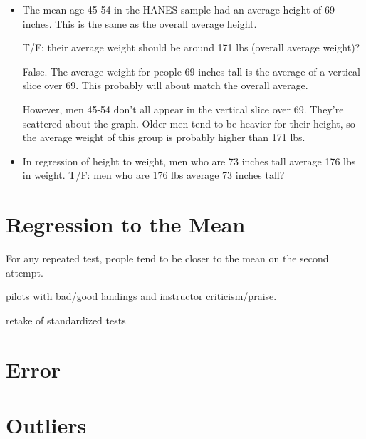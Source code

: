 \documentclass[landscape]{exam}
\begin{document}
\begin{itemize}
    \item The mean age 45-54 in the HANES sample had an average height of 69
      inches.  This is the same as the overall average height.

      T/F: their average weight should be around 171 lbs (overall average weight)?

      \begin{solution}
        False.  The average weight for people 69 inches tall is the average of a
        vertical slice over 69.  This probably will about match the overall average.

        However, men 45-54 don't all appear in the vertical slice over 69.  They're
        scattered about the graph.  Older men tend to be heavier for their height, so
        the average weight of this group is probably higher than 171 lbs.
      \end{solution}

    \item In regression of height to weight, men who are 73 inches tall average 176
      lbs in weight.  T/F: men who are 176 lbs average 73 inches tall?
  \end{itemize}

  \section{Regression to the Mean}
  For any repeated test, people tend to be closer to the mean on the second attempt.

  \begin{itemize*}
    \item pilots with bad/good landings and instructor criticism/praise.
    \item retake of standardized tests
  \end{itemize*}

  \section{Error}

  \section{Outliers}
\end{document}
